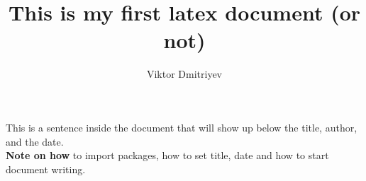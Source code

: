 \documentclass[11pt]{article}
\title{This is my first latex document (or not)}
\author{Viktor Dmitriyev}
\begin{document}
\maketitle

This is a sentence inside the document that will show up below the title, author, and the date. \\

\textbf{Note on how} to import packages, how to set title, date and how to start document writing.
	
\end{document}
